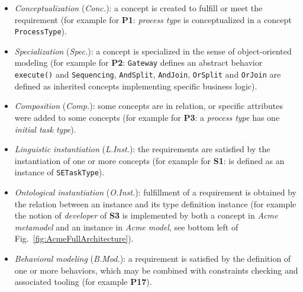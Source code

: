 \begin{itemize}
    \item \emph{Conceptualization} (\textit{Conc.}): a concept is created to fulfill or meet the requirement (for example for \textbf{P1}: \textit{process type} is conceptualized in a concept \texttt{ProcessType}).

    \item \emph{Specialization} (\textit{Spec.}): a concept is specialized in the sense of object-oriented modeling (for example for \textbf{P2}: \texttt{Gateway} defines an abstract behavior \texttt{execute()} and \texttt{Sequencing}, \texttt{AndSplit}, \texttt{AndJoin}, \texttt{OrSplit} and \texttt{OrJoin} are defined as inherited concepts implementing specific business logic).

    \item \emph{Composition} (\textit{Comp.}): some concepts are in relation, or specific attributes were added to some concepts (for example for \textbf{P3}: a \textit{process type} has one \textit{initial task type}).

    \item \emph{Linguistic instantiation} (\textit{L.Inst.}): the requirements are satisfied by the instantiation of one or more concepts (for example for \textbf{S1}:  is defined as an instance of \texttt{SETaskType}).

    \item \emph{Ontological instantiation} (\textit{O.Inst.}): fulfillment of a requirement is obtained by the relation between an instance and its type definition instance (for example the notion of \textit{developer} of \textbf{S3} is implemented by both a concept in \textit{Acme metamodel} and an instance in \textit{Acme model}, see bottom left of Fig.~\ref{fig:AcmeFullArchitecture}).

    \item \emph{Behavioral modeling} (\textit{B.Mod.}): a requirement is satisfied by the definition of one or more behaviors, which may be combined with constraints checking and associated tooling (for example \textbf{P17}).
\end{itemize}





